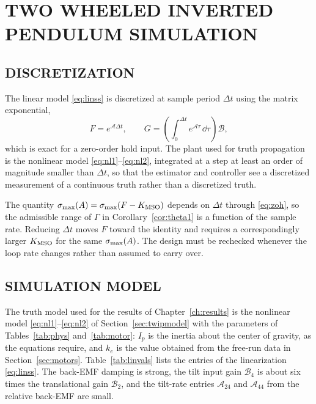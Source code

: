 \chapter{TWO WHEELED INVERTED PENDULUM SIMULATION}
\label{ch:simulation}

\section{DISCRETIZATION}
\label{sec:discretization}

The linear model \eqref{eq:linss} is discretized at sample period $\Delta t$
using the matrix exponential,
\begin{equation}\label{eq:zoh}
F=e^{\mathcal{A}\Delta t},
\qquad
G=\left(\int_0^{\Delta t}e^{\mathcal{A}\tau}\,\dd\tau\right)\mathcal{B},
\end{equation}
which is exact for a zero-order hold input. The plant used for truth propagation
is the nonlinear model \eqref{eq:nl1}--\eqref{eq:nl2}, integrated at a step at
least an order of magnitude smaller than $\Delta t$, so that the estimator and
controller see a discretized measurement of a continuous truth rather than a
discretized truth.

\begin{remark}
The quantity $\sigma_{\max}(A)=\sigma_{\max}(F-K_{\mathrm{MSO}})$ depends on $\Delta t$ through
\eqref{eq:zoh}, so the admissible range of $\Gamma$ in
Corollary~\ref{cor:theta1} is a function of the sample rate. Reducing $\Delta t$
moves $F$ toward the identity and requires a correspondingly larger $K_{\mathrm{MSO}}$ for
the same $\sigma_{\max}(A)$. The design must be rechecked whenever the loop rate
changes rather than assumed to carry over.
\end{remark}

\section{SIMULATION MODEL}
\label{sec:simmodel}

The truth model used for the results of Chapter~\ref{ch:results} is the
nonlinear model \eqref{eq:nl1}--\eqref{eq:nl2} of Section~\ref{sec:twipmodel}
with the parameters of Tables~\ref{tab:phys} and~\ref{tab:motor}: $I_p$ is the
inertia about the center of gravity, as the equations require, and $k_e$ is the
value obtained from the free-run data in Section~\ref{sec:motors}.
Table~\ref{tab:linvals} lists the entries of the linearization
\eqref{eq:linss}. The back-EMF damping is strong, the tilt input gain
$\mathcal{B}_4$ is about six times the translational gain $\mathcal{B}_2$, and
the tilt-rate entries $\mathcal{A}_{24}$ and $\mathcal{A}_{44}$ from the
relative back-EMF are small.

